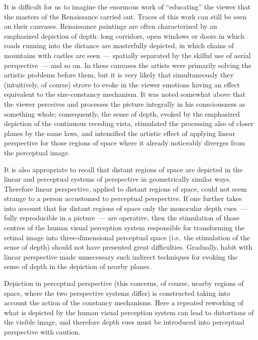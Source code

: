 It is difficult for us to imagine the enormous work of ``educating'' the viewer that the
masters of the Renaissance carried out.  Traces of this work can still be seen on their
canvases.  Renaissance paintings are often characterized by an emphasized depiction of
depth: long corridors, open windows or doors in which roads running into the distance
are masterfully depicted, in which chains of mountains with castles are seen~---
spatially separated by the skilful use of aerial perspective~--- and so on.  In these
canvases the artists were primarily solving the artistic problems before them, but it is
very likely that simultaneously they (intuitively, of course) strove to evoke in the viewer
emotions having an effect equivalent to the size-constancy mechanism.  It was noted
somewhat above that the viewer perceives and processes the picture integrally in his
consciousness as something whole; consequently, the sense of depth, evoked by the
emphasized depiction of the continuous receding vista, stimulated the processing also of
closer planes by the same laws, and intensified the artistic effect of applying linear
perspective for those regions of space where it already noticeably diverges from the
perceptual image.

It is also appropriate to recall that distant regions of space are depicted in the linear and
perceptual systems of perspective in geometrically similar ways.  Therefore linear
perspective, applied to distant regions of space, could not seem strange to a person
accustomed to perceptual perspective.  If one further takes into account that for distant
regions of space only the monocular depth cues~--- fully reproducible in a picture~---
are operative, then the stimulation of those centres of the human visual perception
system responsible for transforming the retinal image into three-dimensional perceptual
space (i.e.\ the stimulation of the sense of depth) should not have presented great
difficulties.  Gradually, habit with linear perspective made unnecessary such indirect
techniques for evoking the sense of depth in the depiction of nearby planes.

Depiction in perceptual perspective (this concerns, of course, nearby regions of space,
where the two perspective systems differ) is constructed taking into account the action
of the constancy mechanisms.  Here a repeated reworking of what is depicted by the
human visual perception system can lead to distortions of the visible image, and
therefore depth cues must be introduced into perceptual perspective with caution.

